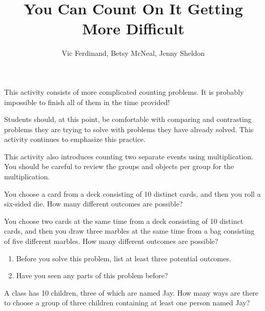 \documentclass{ximera}
\title{You Can Count On It Getting More Difficult}
\author{Vic Ferdinand, Betsy McNeal, Jenny Sheldon}
\begin{document}
\begin{abstract}
\end{abstract}
\maketitle

\begin{instructorIntro}
This activity consists of more complicated counting problems.  It is probably impossible to finish all of them in the time provided!

Students should, at this point, be comfortable with comparing and contrasting problems they are trying to solve with problems they have already solved.  This activity continues to emphasize this practice.

This activity also introduces counting two separate events using multiplication.  You should be careful to review the groups and objects per group for the multiplication.
\end{instructorIntro}



\begin{problem}
You choose a card from a deck consisting of 10 distinct cards, and then you roll a six-sided die.  How many different outcomes are possible?
\end{problem}

\begin{problem}
You choose two cards at the same time from a deck consisting of 10 distinct cards, and then you draw three marbles at the same time from a bag consisting of five different marbles.  How many different outcomes are possible?
\begin{enumerate}
\item Before you solve this problem, list at least three potential outcomes.
\item Have you seen any parts of this problem before?
\end{enumerate}
\end{problem}

\begin{problem}
A class has 10 children, three of which are named Jay.  How many ways are there to choose a group of three children containing at least one person named Jay?
\end{problem}
\end{document}
